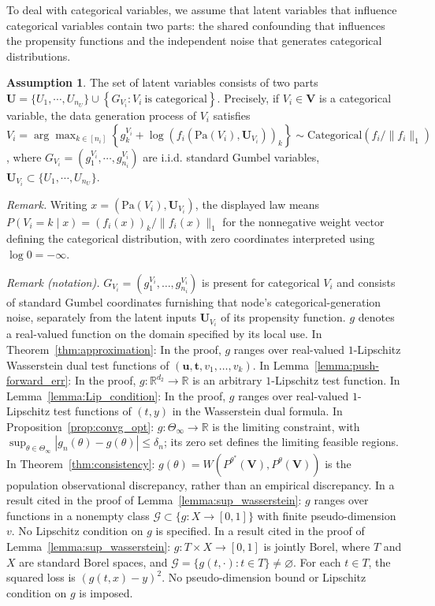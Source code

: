 \documentclass[12pt]{article}
\theoremstyle{plain}
\theoremstyle{definition}
\newtheorem{assumption}[theorem]{Assumption}
\theoremstyle{remark}
\begin{document}
To deal with categorical variables, we assume that latent variables that influence categorical variables contain two parts: the shared confounding that influences the propensity functions and the independent noise that generates categorical distributions. 
\begin{assumption}\label{assump:categorical_rv}
The set of latent variables consists of two parts  $\boldsymbol{U} =\{U_{1} ,\cdots ,U_{n_{U}} \}\cup \left\{G_{V_{i}} :V_{i} \ \text{is categorical}\right\}$. Precisely, if $ V_{i} \in \boldsymbol{V}$ is a categorical variable, the data generation process of $ V_{i}$ satisfies $V_{i} =\arg\max_{k\in [ n_{i}]}\left\{g^{V_i}_{k} +\log\left( f_{i}\left(\text{Pa}( V_{i}),\boldsymbol{U}_{V_{i}}\right)\right) _{k}\right\}\sim \text{Categorical}(f_i/\|f_i\|_1)$, where $ G_{V_i}= (g^{V_i}_1,\cdots,g^{V_i}_{n_i})$ are i.i.d. standard Gumbel variables, $\boldsymbol{U}_{V_i} \subset \{U_{1} ,\cdots ,U_{n_{U}} \}$. 
\end{assumption}

\noindent\textit{Remark.} Writing $x=(\text{Pa}(V_i),\boldsymbol{U}_{V_i})$, the displayed law means $P(V_i=k\mid x)=(f_i(x))_k/\|f_i(x)\|_1$ for the nonnegative weight vector defining the categorical distribution, with zero coordinates interpreted using $\log 0=-\infty$.

\noindent\textit{Remark (notation).} $G_{V_i}=(g_1^{V_i},\ldots,g_{n_i}^{V_i})$ is present for categorical $V_i$ and consists of standard Gumbel coordinates furnishing that node's categorical-generation noise, separately from the latent inputs $\boldsymbol{U}_{V_i}$ of its propensity function. $g$ denotes a real-valued function on the domain specified by its local use. In Theorem~\ref{thm:approximation}: In the proof, $g$ ranges over real-valued $1$-Lipschitz Wasserstein dual test functions of $(\boldsymbol{u},\boldsymbol{t},v_1,\ldots,v_k)$. In Lemma~\ref{lemma:push-forward_err}: In the proof, $g:\mathbb{R}^{d_2}\rightarrow\mathbb{R}$ is an arbitrary $1$-Lipschitz test function. In Lemma~\ref{lemma:Lip_condition}: In the proof, $g$ ranges over real-valued $1$-Lipschitz test functions of $(t,y)$ in the Wasserstein dual formula. In Proposition~\ref{prop:convg_opt}: $g:\Theta_\infty\rightarrow\mathbb{R}$ is the limiting constraint, with $\sup_{\theta\in\Theta_\infty}|g_n(\theta)-g(\theta)|\leqslant\delta_n$; its zero set defines the limiting feasible regions. In Theorem~\ref{thm:consistency}: $g(\theta)=W(P^{\theta^*}(\boldsymbol{V}),P^\theta(\boldsymbol{V}))$ is the population observational discrepancy, rather than an empirical discrepancy. In a result cited in the proof of Lemma~\ref{lemma:sup_wasserstein}: $g$ ranges over functions in a nonempty class $\mathcal G\subset\{g:X\rightarrow[0,1]\}$ with finite pseudo-dimension $v$. No Lipschitz condition on $g$ is specified. In a result cited in the proof of Lemma~\ref{lemma:sup_wasserstein}: $g:T\times X\rightarrow[0,1]$ is jointly Borel, where $T$ and $X$ are standard Borel spaces, and $\mathcal G=\{g(t,\cdot):t\in T\}\ne\varnothing$. For each $t\in T$, the squared loss is $(g(t,x)-y)^2$. No pseudo-dimension bound or Lipschitz condition on $g$ is imposed.
\end{document}
